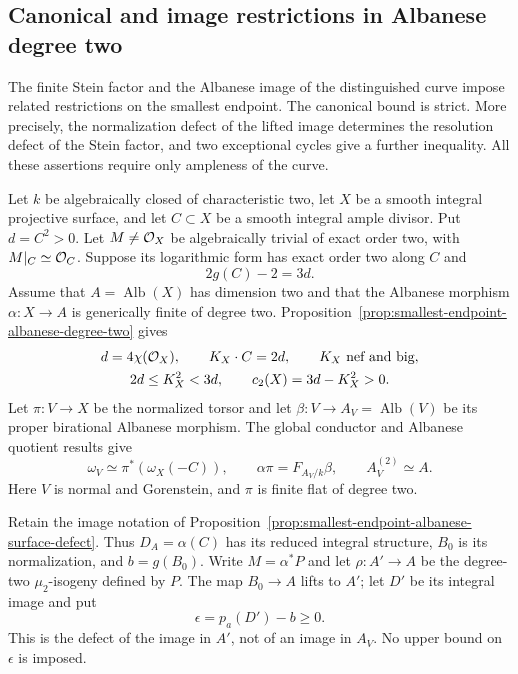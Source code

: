 \subsection{Canonical and image restrictions in Albanese degree two}
\label{subsec:smallest-endpoint-strict-canonical}

The finite Stein factor and the Albanese image of the distinguished
curve impose related restrictions on the smallest endpoint.
The canonical bound is strict.  More precisely, the normalization
defect of the lifted image determines the resolution defect of the
Stein factor, and two exceptional cycles give a further inequality.
All these assertions require only ampleness of the curve.

Let $k$ be algebraically closed of characteristic two, let $X$ be a
smooth integral projective surface, and let $C\subset X$ be a smooth
integral ample divisor.  Put $d=C^2>0$.  Let $M\ne\mathcal O_X$ be
algebraically trivial of exact order two, with $M|_C\simeq\mathcal O_C$.
Suppose its logarithmic form has exact order two along $C$ and
\[
 2g(C)-2=3d.
\]
Assume that $A=\operatorname{Alb}(X)$ has dimension two and that
the Albanese morphism $\alpha:X\to A$ is generically finite of
degree two.  Proposition~\ref{prop:smallest-endpoint-albanese-degree-two}
gives
\begin{equation}\label{eq:strict-canonical-prior-numerics}
 \begin{gathered}
 d=4\chi(\mathcal O_X),\qquad K_X\cdot C=2d,\qquad
 K_X\ \text{nef and big},\\
 2d\le K_X^2<3d,\qquad c_2(X)=3d-K_X^2>0.
 \end{gathered}
\end{equation}
Let $\pi:V\to X$ be the normalized torsor and let
$\beta:V\to A_V=\operatorname{Alb}(V)$ be its proper
birational Albanese morphism.
The global conductor and Albanese quotient results give
\begin{equation}\label{eq:strict-canonical-cover-data}
 \omega_V\simeq\pi^*(\omega_X(-C)),\qquad
 \alpha\pi=F_{A_V/k}\beta,\qquad A_V^{(2)}\simeq A.
\end{equation}
Here $V$ is normal and Gorenstein, and $\pi$ is finite flat of
degree two.

Retain the image notation of
Proposition~\ref{prop:smallest-endpoint-albanese-surface-defect}.
Thus $D_A=\alpha(C)$ has its reduced integral structure, $B_0$ is
its normalization, and $b=g(B_0)$.
Write $M=\alpha^*P$ and let $\rho:A'\to A$ be the degree-two
$\mu_2$-isogeny defined by $P$.
The map $B_0\to A$ lifts to $A'$; let $D'$ be its integral image and put
\begin{equation}\label{eq:strict-canonical-image-defect-definition}
 \epsilon=p_a(D')-b\ge0.
\end{equation}
This is the defect of the image in $A'$, not of an image in $A_V$.
No upper bound on $\epsilon$ is imposed.

